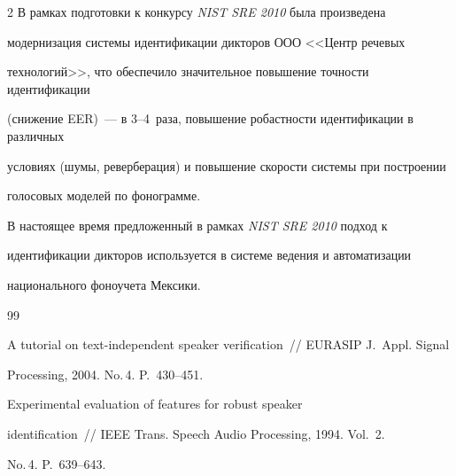 \begin{multicols}{2}
  В рамках подготовки к конкурсу \textit{NIST SRE 2010} была произведена 


модернизация системы идентификации дикторов ООО <<Центр речевых 


технологий>>, что обеспечило значительное повышение точности идентификации 


(снижение EER)~--- в 3--4~раза, повышение робастности идентификации в различных 


условиях (шумы, реверберация) и повышение скорости системы при построении 


голосовых моделей по фонограмме.


  


  В настоящее время предложенный в рамках \textit{NIST SRE 2010} подход к 


идентификации дикторов используется в системе ведения и автоматизации 


национального фоноучета Мексики.










{\small\frenchspacing


{%




\begin{thebibliography}{99}


  






  A tutorial on text-independent speaker verification~// EURASIP J.~Appl. Signal 


Processing, 2004. No.\,4. P.~430--451.


  




   Experimental evaluation of features for robust speaker 


identification~// IEEE Trans. Speech Audio Processing, 1994. Vol.~2. 


No.\,4. P.~639--643.






\end{thebibliography}}}
\end{multicols}
